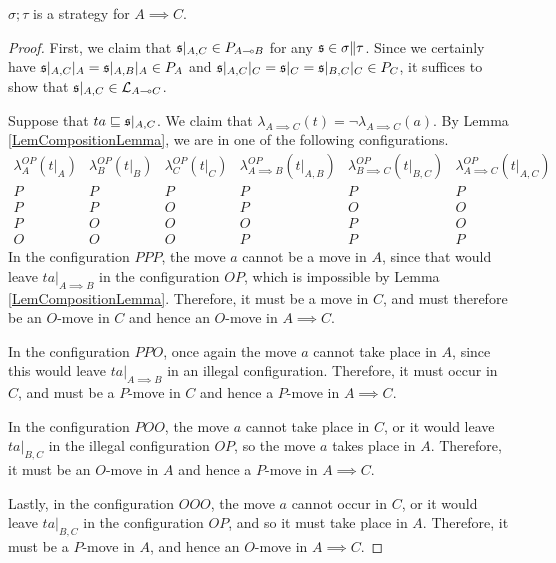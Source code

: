 \documentclass[11pt]{report}
\begin{document}
\begin{proposition}
  $\sigma;\tau$ is a strategy for $A\implies C$.  
  \label{PropComposition}
\end{proposition}
\begin{proof}
  First, we claim that $\mathfrak s\vert_{A,C}\in P_{A\multimap B}$ for any $\mathfrak s\in \sigma\|\tau$.
  Since we certainly have $\mathfrak s\vert_{A,C}\vert_A = \mathfrak s\vert_{A,B}\vert_A\in P_A$ and $\mathfrak s\vert_{A,C}\vert_C = \mathfrak s\vert_C = \mathfrak s\vert_{B,C}\vert_C\in P_C$, it suffices to show that $\mathfrak s\vert_{A,C}\in \mathcal L_{A\multimap C}$.

  Suppose that $ta\sqsubseteq \mathfrak s\vert_{A,C}$.  We claim that $\lambda_{A\implies C}(t) = \neg\lambda_{A\implies C}(a)$.
  By Lemma \ref{LemCompositionLemma}, we are in one of the following configurations.
  \small
  \[
    \begin{array}{ccc|ccc}
      \lambda_A^{OP}(t\vert_A) & \lambda_B^{OP}(t\vert_B) & \lambda_C^{OP}(t\vert_C) & \lambda_{A\implies B}^{OP}(t\vert_{A,B}) & \lambda_{B\implies C}^{OP}(t\vert_{B,C}) & \lambda_{A\implies C}^{OP}(t\vert_{A,C}) \\
      \hline
      P & P & P & P & P & P \\
      P & P & O & P & O & O \\
      P & O & O & O & P & O \\
      O & O & O & P & P & P 
    \end{array}
    \]
  \normalsize
  In the configuration $PPP$, the move $a$ cannot be a move in $A$, since that would leave $ta\vert_{A\implies B}$ in the configuration $OP$, which is impossible by Lemma \ref{LemCompositionLemma}.  
  Therefore, it must be a move in $C$, and must therefore be an $O$-move in $C$ and hence an $O$-move in $A\implies C$.

  In the configuration $PPO$, once again the move $a$ cannot take place in $A$, since this would leave $ta\vert_{A\implies B}$ in an illegal configuration.  
  Therefore, it must occur in $C$, and must be a $P$-move in $C$ and hence a $P$-move in $A\implies C$.

  In the configuration $POO$, the move $a$ cannot take place in $C$, or it would leave $ta\vert_{B,C}$ in the illegal configuration $OP$, so the move $a$ takes place in $A$.  
  Therefore, it must be an $O$-move in $A$ and hence a $P$-move in $A\implies C$.  

  Lastly, in the configuration $OOO$, the move $a$ cannot occur in $C$, or it would leave $ta\vert_{B,C}$ in the configuration $OP$, and so it must take place in $A$.  
  Therefore, it must be a $P$-move in $A$, and hence an $O$-move in $A\implies C$.


\end{proof}
\end{document}
